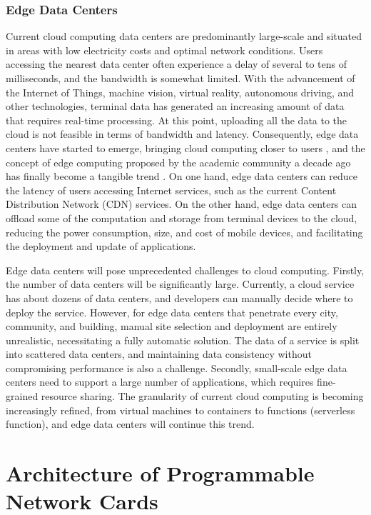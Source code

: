 \subsubsection{Edge Data Centers}

Current cloud computing data centers are predominantly large-scale and situated in areas with low electricity costs and optimal network conditions. Users accessing the nearest data center often experience a delay of several to tens of milliseconds, and the bandwidth is somewhat limited. With the advancement of the Internet of Things, machine vision, virtual reality, autonomous driving, and other technologies, terminal data has generated an increasing amount of data that requires real-time processing. At this point, uploading all the data to the cloud is not feasible in terms of bandwidth and latency. Consequently, edge data centers have started to emerge, bringing cloud computing closer to users \cite{edge-data-center}, and the concept of edge computing proposed by the academic community a decade ago has finally become a tangible trend \cite{satyanarayanan2009case}. On one hand, edge data centers can reduce the latency of users accessing Internet services, such as the current Content Distribution Network (CDN) services. On the other hand, edge data centers can offload some of the computation and storage from terminal devices to the cloud, reducing the power consumption, size, and cost of mobile devices, and facilitating the deployment and update of applications.

Edge data centers will pose unprecedented challenges to cloud computing. Firstly, the number of data centers will be significantly large. Currently, a cloud service has about dozens of data centers, and developers can manually decide where to deploy the service. However, for edge data centers that penetrate every city, community, and building, manual site selection and deployment are entirely unrealistic, necessitating a fully automatic solution. The data of a service is split into scattered data centers, and maintaining data consistency without compromising performance is also a challenge. Secondly, small-scale edge data centers need to support a large number of applications, which requires fine-grained resource sharing. The granularity of current cloud computing is becoming increasingly refined, from virtual machines to containers to functions (serverless function), and edge data centers will continue this trend.

\fi

\section{Architecture of Programmable Network Cards}
\label{smartnic-architecture}

